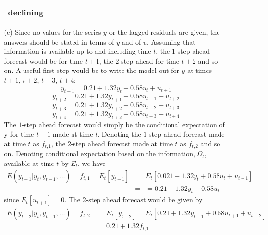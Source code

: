 \documentclass[11pt,a4paper]{article}
\begin{document}
\begin{itemize}
\begin{itemize}
\begin{tabular}{c|cc}
declining\\
\hline
\end{tabular}
\item[(c)]
Since no values for
 the series $y$ or the lagged residuals are given, the answers should be stated
in terms of $y$ and of $u$. Assuming that information is available up to and
including time $t$, the $1$-step ahead forecast would be for time
$t+1$, the $2$-step
ahead for time $t+2$ and so on. A useful first step would be to write the model
out for $y$ at times $t+1$, $t+2$, $t+3$, $t+4$:
$$
y_{t +1} = 0.21 + 1.32 y_t + 0.58 u_t + u_{t +1}
$$
$$
y_{t + 2} = 0.21 + 1.32 y_{t +1} +  0.58 u_{t +1} + u_{t + 2}
$$
$$
 y_{t +3} = 0.21 + 1.32 y_{t + 2} + 0.58 u_{t + 2} + u_{t +3}
$$
$$
y_{t + 4} = 0.21 + 1.32 y_{t +3} + 0.58 u_{t +3} + u_{t + 4}
$$
The $1$-step ahead forecast
would simply be the conditional expectation of y for time $t+1$ made at time
$t$.
Denoting the $1$-step ahead forecast made at time $t$ as $f_{t,1}$, the $2$-step ahead
forecast made at time $t$ as $f_{t,2}$ and so on. Denoting
conditional expectation based on the information, $\Omega_t$, available
at time $t$ by  $E_{t}$, we have
$$
\begin{array}{rcl}
E( y_{t +1}| y_{t}, y_{t -1} , \ldots) = f_{t,1} = E_t [ y_{t +1} ] & = & E_t [0.021 + 1.32 y_t + 0.58u_t + u_{t +1} ] \\
 & = & = 0.21 + 1.32 y_t + 0.58u_t
\end{array}
$$
since $E_t[u_{t+1}]=0$.
The 2-step ahead forecast would be given by
$$
\begin{array}{rcl}
E ( y_{t + 2}| y_t , y_{t -1}, \ldots) = f_{t,2} & = & E_t [ y_{t + 2} ]
= E_t [0.21 + 1.32 y_{t +1} + 0.58u_{t +1} + u_{t + 2} ] \\
& = & 0.21 + 1.32 f_{t,1}
\end{array}
$$
\end{itemize}
\end{itemize}
\end{document}

